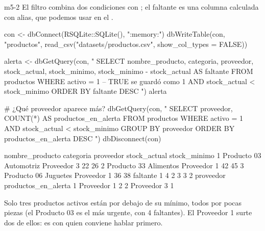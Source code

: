\begin{solucion}{m5-2}
El filtro combina dos condiciones con ; el faltante es una
columna calculada con alias, que podemos usar en el .

\begin{rcode}
con <- dbConnect(RSQLite::SQLite(), ":memory:")
dbWriteTable(con, "productos",
             read_csv("datasets/productos.csv", show_col_types = FALSE))

alerta <- dbGetQuery(con, "
  SELECT nombre_producto, categoria, proveedor, stock_actual,
         stock_minimo, stock_minimo - stock_actual AS faltante
  FROM productos
  WHERE activo = 1                       -- TRUE se guardó como 1
    AND stock_actual < stock_minimo
  ORDER BY faltante DESC
")
alerta

# ¿Qué proveedor aparece más?
dbGetQuery(con, "
  SELECT proveedor, COUNT(*) AS productos_en_alerta
  FROM productos
  WHERE activo = 1 AND stock_actual < stock_minimo
  GROUP BY proveedor
  ORDER BY productos_en_alerta DESC
")
dbDisconnect(con)
\end{rcode}

\begin{rsalida}
  nombre_producto  categoria   proveedor stock_actual stock_minimo
1     Producto 03 Automotriz Proveedor 3           22           26
2     Producto 33  Alimentos Proveedor 1           42           45
3     Producto 06   Juguetes Proveedor 1           36           38
  faltante
1        4
2        3
3        2
    proveedor productos_en_alerta
1 Proveedor 1                   2
2 Proveedor 3                   1
\end{rsalida}

Solo tres productos activos están por debajo de su mínimo, todos por pocas
piezas (el Producto 03 es el más urgente, con 4 faltantes). El Proveedor 1
surte dos de ellos: es con quien conviene hablar primero.
\end{solucion}


